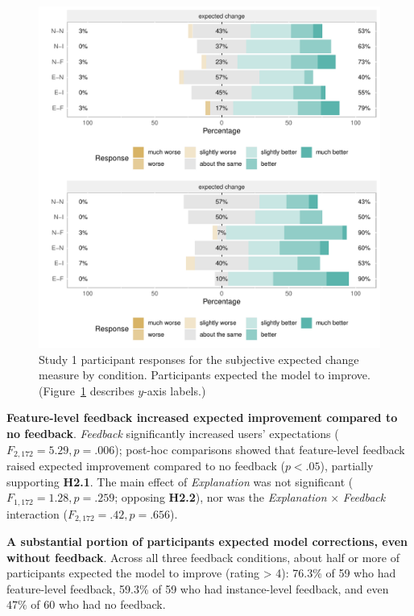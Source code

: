 \begin{figure}
    \centering
    \includegraphics[width=\linewidth]{figures/exp-plots-study1.pdf}
    \caption{Study 1 participant responses for the subjective expected
change measure by condition. Participants expected
the model to improve. (Figure~\ref{fig:study1measures} describes $y$-axis labels.)}
    \label{fig:study1measures}
\end{figure}

\textbf{Feature-level feedback increased expected improvement compared to no feedback}.
%
\textit{Feedback} significantly increased users' expectations ($F_{2,172}=5.29, p=.006$);  post-hoc comparisons showed that feature-level feedback raised expected improvement compared to no feedback ($p<.05$), partially supporting \textbf{H2.1}. The main effect of \textit{Explanation} was not significant ($F_{1,172}=1.28, p=.259$; opposing \textbf{H2.2}), nor was the \textit{Explanation} $\times$ \textit{Feedback} interaction ($F_{2,172}=.42, p=.656$).

\textbf{A substantial portion of participants expected model corrections, even without feedback}.
%
Across all three feedback conditions, about half or more of participants expected the model to improve (rating > 4): 76.3\% of 59 who had feature-level feedback, 59.3\% of 59 who had instance-level feedback, and even $47\%$ of 60 who had no feedback. 


